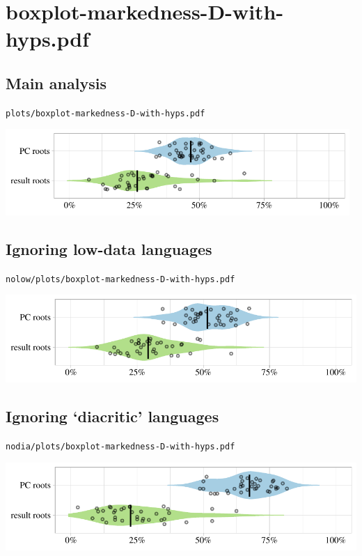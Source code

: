 \eject

\section{boxplot-markedness-D-with-hyps.pdf}

\subsection{Main analysis}

\texttt{plots/boxplot-markedness-D-with-hyps.pdf}

\includegraphics[width=0.98\textwidth]{../plots/boxplot-markedness-D-with-hyps.pdf}

\subsection{Ignoring low-data languages}

\texttt{nolow/plots/boxplot-markedness-D-with-hyps.pdf}

\includegraphics[width=1.0\textwidth]{../nolow/plots/boxplot-markedness-D-with-hyps.pdf}

\subsection{Ignoring `diacritic' languages}

\texttt{nodia/plots/boxplot-markedness-D-with-hyps.pdf}

\includegraphics[width=1.0\textwidth]{../nodia/plots/boxplot-markedness-D-with-hyps.pdf}

